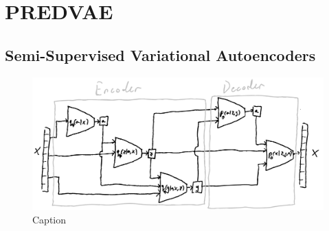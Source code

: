 \section{PREDVAE}
\label{sec:methods}





\subsection{Semi-Supervised Variational Autoencoders}
\label{subsec:ssvae}

\begin{figure}[ht!]
    \centering
    \includegraphics[width=\textwidth]{static/model_sketch.png}
    \caption{Caption}
    \label{fig:sketch}
\end{figure}

